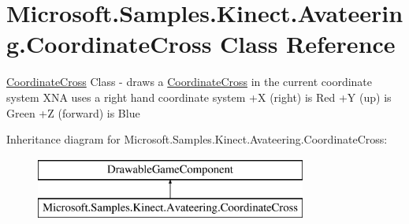 \hypertarget{class_microsoft_1_1_samples_1_1_kinect_1_1_avateering_1_1_coordinate_cross}{\section{Microsoft.\+Samples.\+Kinect.\+Avateering.\+Coordinate\+Cross Class Reference}
\label{class_microsoft_1_1_samples_1_1_kinect_1_1_avateering_1_1_coordinate_cross}
}


\hyperlink{class_microsoft_1_1_samples_1_1_kinect_1_1_avateering_1_1_coordinate_cross}{Coordinate\+Cross} Class -\/ draws a \hyperlink{class_microsoft_1_1_samples_1_1_kinect_1_1_avateering_1_1_coordinate_cross}{Coordinate\+Cross} in the current coordinate system X\+N\+A uses a right hand coordinate system +\+X (right) is Red +\+Y (up) is Green +\+Z (forward) is Blue  


Inheritance diagram for Microsoft.\+Samples.\+Kinect.\+Avateering.\+Coordinate\+Cross\+:\begin{figure}[H]
\begin{center}
\leavevmode
\includegraphics[height=2.000000cm]{class_microsoft_1_1_samples_1_1_kinect_1_1_avateering_1_1_coordinate_cross}
\end{center}
\end{figure}
